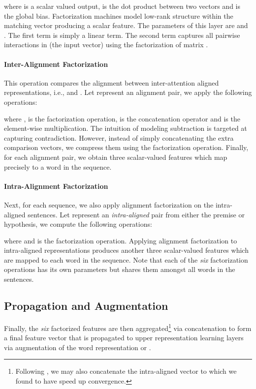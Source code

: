 \documentclass[11pt,a4paper]{article}
\begin{document}
where  is a scalar valued output,  is the dot product between two vectors and  is the global bias. Factorization machines model low-rank structure within the matching vector producing a scalar feature.  The parameters of this layer are  and . The first term  is simply a linear term. The second term  captures all pairwise interactions in  (the input vector) using the factorization of matrix .

\paragraph{Inter-Alignment Factorization}
This operation compares the alignment between inter-attention aligned representations, i.e.,  and . Let  represent an alignment pair, we apply the following operations:

where ,  is the factorization operation,  is the concatenation operator and  is the element-wise multiplication. The intuition of modeling subtraction is targeted at capturing contradiction. However, instead of simply concatenating the extra comparison vectors, we compress them using the factorization operation. Finally, for each alignment pair, we obtain three scalar-valued features which map precisely to a word in the sequence.
\paragraph{Intra-Alignment Factorization}
Next, for each sequence, we also apply alignment factorization on the intra-aligned sentences. Let  represent an \textit{intra-aligned} pair from either the premise or hypothesis, we compute the following operations:

where  and  is the factorization operation. Applying alignment factorization to intra-aligned representations produces another three scalar-valued features which are mapped to each word in the sequence. Note that each of the \textit{six} factorization operations has its own parameters but shares them amongst all words in the sentences.

\subsection{Propagation and Augmentation}
Finally, the \textit{six} factorized features are then aggregated\footnote{Following \cite{DBLP:conf/emnlp/ParikhT0U16}, we may also concatenate the intra-aligned vector to  which we found to have speed up convergence.} via concatenation to form a final feature vector that is propagated to upper representation learning layers via augmentation of the word representation  or .
\end{document}
